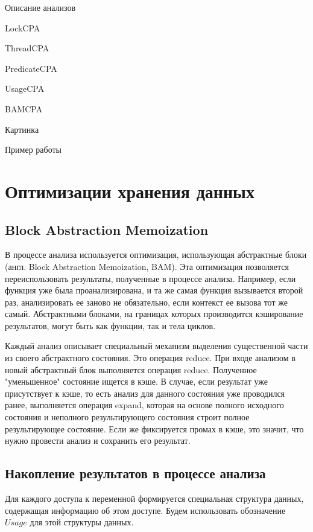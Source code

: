 Описание анализов

LockCPA

ThreadCPA

PredicateCPA

UsageCPA

BAMCPA

Картинка

Пример работы 

\section{Оптимизации хранения данных} \label{sect_impl_storage}

\subsection{Block Abstraction Memoization} \label{subsect_impl_bam}

В процессе анализа используется оптимизация, использующая абстрактные блоки (англ. Block Abstraction Memoization, BAM). 
Эта оптимизация позволяется переиспользовать результаты, полученные в процессе анализа.
Например, если функция уже была проанализирована, и та же самая функция вызывается второй раз, анализировать ее заново не обязательно, если контекст ее вызова тот же самый.
Абстрактными блоками, на границах которых производится кэширование результатов, могут быть как функции, так и тела циклов. 

Каждый анализ описывает специальный механизм выделения существенной части из своего абстрактного состояния. Это операция reduce. 
При входе анализом в новый абстрактный блок выполняется операция reduce. Полученное "уменьшенное" состояние ищется в кэше.
В случае, если результат уже присутствует к кэше, то есть анализ для данного состояния уже проводился ранее, выполняется операция expand, которая на основе полного исходного состояния и неполного результирующего состояния строит полное результирующее состояние. 
Если же фиксируется промах в кэше, это значит, что нужно провести анализ и сохранить его результат. 

\subsection{Накопление результатов в процессе анализа} \label{subsect_impl_storage}

Для каждого доступа к переменной формируется специальная структура данных, содержащая информацию об этом доступе. 
Будем использовать обозначение $Usage$ для этой структуры данных.

